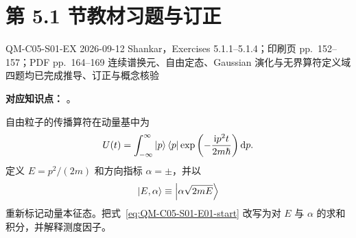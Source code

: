 
\section{第 5.1 节教材习题与订正}
\label{exercise-set:QM-C05-S01}

\exercisemeta
  {QM-C05-S01-EX}
  {2026-09-12}
  {Shankar，Exercises 5.1.1--5.1.4；印刷页 pp.~152--157；PDF pp.~164--169}
  {连续谱换元、自由定态、Gaussian 演化与无界算符定义域}
  {四题均已完成推导、订正与概念核验}


\textbf{对应知识点：}
。

自由粒子的传播算符在动量基中为
\begin{equation}
  U(t)=\int_{-\infty}^{\infty}
  \left|p\right\rangle\left\langle p\right|\exp\left(-\frac{\mathrm{i} p^2t}{2m\hbar}\right)\mathop{}\!\mathrm{d} p.
  \label{eq:QM-C05-S01-E01-start}
\end{equation}
定义 $E=p^2/(2m)$ 和方向指标 $\alpha=\pm$，并以
\begin{equation}
  \left|E,\alpha\right\rangle\equiv
  \left|\alpha\sqrt{2mE}\right\rangle
  \label{eq:QM-C05-S01-E01-branch-definition}
\end{equation}
重新标记动量本征态。把式~\eqref{eq:QM-C05-S01-E01-start} 改写为对 $E$ 与 $\alpha$ 的求和积分，并解释测度因子。

